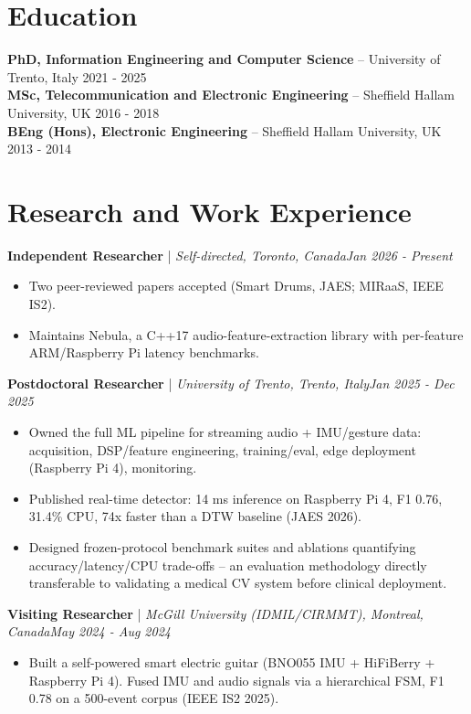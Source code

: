 \documentclass[11pt]{article}
\newenvironment{cvrole}[5]{%
  \par\noindent\textbf{\large #1} | \textit{\small #2, #3}\hfill \textit{\small #4 - #5}\par
  \begin{itemize}[leftmargin=2em, itemsep=-0.3em, topsep=-0.5em]%
}{%
  \end{itemize}\par\noindent\mbox{}\par\vspace{0.1em}%
}
\begin{document}
\section*{Education}
\textbf{PhD, Information Engineering and Computer Science} -- University of Trento, Italy \hfill 2021 - 2025 \\
\textbf{MSc, Telecommunication and Electronic Engineering} -- Sheffield Hallam University, UK \hfill 2016 - 2018 \\
\textbf{BEng (Hons), Electronic Engineering} -- Sheffield Hallam University, UK \hfill 2013 - 2014 \\

\section*{Research and Work Experience}

\begin{cvrole}{Independent Researcher}{Self-directed}{Toronto, Canada}{Jan 2026}{Present}
\item Two peer-reviewed papers accepted (Smart Drums, JAES; MIRaaS, IEEE IS2).
\item Maintains Nebula, a C++17 audio-feature-extraction library with per-feature ARM/Raspberry Pi latency benchmarks.
\end{cvrole}

\begin{cvrole}{Postdoctoral Researcher}{University of Trento}{Trento, Italy}{Jan 2025}{Dec 2025}
\item Owned the full ML pipeline for streaming audio + IMU/gesture data: acquisition, DSP/feature engineering, training/eval, edge deployment (Raspberry Pi 4), monitoring.
\item Published real-time detector: 14 ms inference on Raspberry Pi 4, F1 0.76, 31.4\% CPU, 74x faster than a DTW baseline (JAES 2026).
\item Designed frozen-protocol benchmark suites and ablations quantifying accuracy/latency/CPU trade-offs -- an evaluation methodology directly transferable to validating a medical CV system before clinical deployment.
\end{cvrole}

\begin{cvrole}{Visiting Researcher}{McGill University (IDMIL/CIRMMT)}{Montreal, Canada}{May 2024}{Aug 2024}
\item Built a self-powered smart electric guitar (BNO055 IMU + HiFiBerry + Raspberry Pi 4). Fused IMU and audio signals via a hierarchical FSM, F1 0.78 on a 500-event corpus (IEEE IS2 2025).
\end{cvrole}
\end{document}
